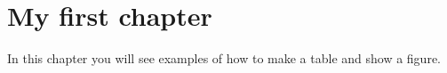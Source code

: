 %
%
%



\chapter{My first chapter}
In this chapter you will see examples of how to make a table and show a figure.

